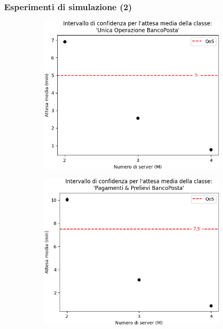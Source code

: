 \documentclass[
	usepdftitle=false,
	xcolor={table, dvipsnames},
	hyperref={
		pdftitle={Studio delle prestazioni di un Ufficio Postale ispirato a Poste Italiane},
    	pdfauthor={A. Chillotti, C. Cuffaro e S. Tiberi}
    }
]{beamer}
\begin{document}
\begin{frame}
\frametitle{Esperimenti di simulazione (2)}
\begin{figure}[ht]
\centering
\begin{subfigure}[b]{0.3\textwidth}
\centering
\includegraphics[width=\textwidth]{plots/d0-trans}
\end{subfigure}    
\begin{subfigure}[b]{0.3\textwidth}  
\centering 
\includegraphics[width=\textwidth]{plots/d1-trans}   
\end{subfigure}

\end{figure}
\end{frame}
\end{document}
